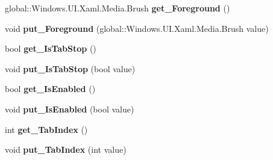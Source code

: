 \begin{DoxyCompactItemize}
global\+::\+Windows.\+U\+I.\+Xaml.\+Media.\+Brush {\bfseries get\+\_\+\+Foreground} ()
\item 
\mbox{\label{interface_windows_1_1_u_i_1_1_xaml_1_1_controls_1_1_i_control_a6a0ed2bdfead49d6dd9e637cc2a53e1a}} 
void {\bfseries put\+\_\+\+Foreground} (global\+::\+Windows.\+U\+I.\+Xaml.\+Media.\+Brush value)
\item 
\mbox{\label{interface_windows_1_1_u_i_1_1_xaml_1_1_controls_1_1_i_control_a20a0b52e3d736f000750ae5521ff5331}} 
bool {\bfseries get\+\_\+\+Is\+Tab\+Stop} ()
\item 
\mbox{\label{interface_windows_1_1_u_i_1_1_xaml_1_1_controls_1_1_i_control_aa68f56eae9d742596d921ebd0fa1d01a}} 
void {\bfseries put\+\_\+\+Is\+Tab\+Stop} (bool value)
\item 
\mbox{\label{interface_windows_1_1_u_i_1_1_xaml_1_1_controls_1_1_i_control_af6badb421eed5eedf78de5f6a798069f}} 
bool {\bfseries get\+\_\+\+Is\+Enabled} ()
\item 
\mbox{\label{interface_windows_1_1_u_i_1_1_xaml_1_1_controls_1_1_i_control_a77bf29586295b2ff15c2306dc6daf932}} 
void {\bfseries put\+\_\+\+Is\+Enabled} (bool value)
\item 
\mbox{\label{interface_windows_1_1_u_i_1_1_xaml_1_1_controls_1_1_i_control_a0849d00c16f282e234c52079d37fbd5a}} 
int {\bfseries get\+\_\+\+Tab\+Index} ()
\item 
\mbox{\label{interface_windows_1_1_u_i_1_1_xaml_1_1_controls_1_1_i_control_a18bbebda6a6cee0159bb14a9ac6ee66f}} 
void {\bfseries put\+\_\+\+Tab\+Index} (int value)
\item 
\mbox{\label{interface_windows_1_1_u_i_1_1_xaml_1_1_controls_1_1_i_control_a81ca470482b238153cd3f15d30056ed8}} 

\end{DoxyCompactItemize}
